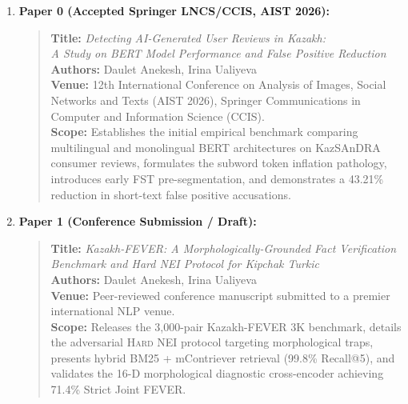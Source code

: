 \begin{enumerate}
    \item \textbf{Paper 0 (Accepted Springer LNCS/CCIS, AIST 2026):}
    \begin{quote}
    \textbf{Title:} \textit{Detecting AI-Generated User Reviews in Kazakh:}\\
    \textit{A Study on BERT Model Performance and False Positive Reduction}~\citep{anekesh2026detecting}\\
    \textbf{Authors:} Daulet Anekesh, Irina Ualiyeva\\
    \textbf{Venue:} 12th International Conference on Analysis of Images, Social Networks and Texts (AIST 2026), Springer Communications in Computer and Information Science (CCIS).\\
    \textbf{Scope:} Establishes the initial empirical benchmark comparing multilingual and monolingual BERT architectures on KazSAnDRA consumer reviews, formulates the subword token inflation pathology, introduces early FST pre-segmentation, and demonstrates a 43.21\% reduction in short-text false positive accusations.
    \end{quote}
    
    \item \textbf{Paper 1 (Conference Submission / Draft):}
    \begin{quote}
    \textbf{Title:} \textit{Kazakh-FEVER: A Morphologically-Grounded Fact Verification Benchmark and Hard NEI Protocol for Kipchak Turkic}~\citep{anekesh2026kazakhfever}\\
    \textbf{Authors:} Daulet Anekesh, Irina Ualiyeva\\
    \textbf{Venue:} Peer-reviewed conference manuscript submitted to a premier international NLP venue.\\
    \textbf{Scope:} Releases the 3,000-pair Kazakh-FEVER 3K benchmark, details the adversarial \textsc{Hard NEI} protocol targeting morphological traps, presents hybrid BM25 + mContriever retrieval (99.8\% Recall@5), and validates the 16-D morphological diagnostic cross-encoder achieving 71.4\% Strict Joint FEVER.
    \end{quote}
    

\end{enumerate}
